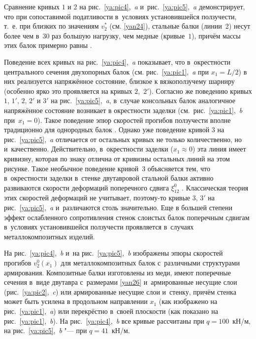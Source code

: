 Сравнение кривых $1$ и $2$ на рис.~\ref{ya:pic4},~{\sl a} и~рис.~\ref{ya:pic5},~{\sl a} демонстрирует, 
что при сопоставимой податливости в~условиях установившейся ползучести, т.~е. при близких по значениям $v_2^*$ (см. \eqref{yan24}), стальные балки (линии~2) несут более чем в~30 раз большую нагрузку, чем медные (кривые~$1$), причём массы этих балок примерно равны \cite{yan:bib15}.

Поведение всех кривых на рис.~\ref{ya:pic4},~{\sl a} показывает, что в~окрестности центрального сечения двухопорных балок (см. рис.~\ref{ya:pic1},~{\sl a} при $x_1=L/2$) в них реализуется напряжённое состояние, 
близкое к вязкоползучему шарниру (особенно ярко это проявляется на кривых $2$,~$2'$). 
Согласно же поведению кривых $1$, $1'$, $2$, $2'$ и $3'$ на рис.~\ref{ya:pic5},~{\sl a}, в~случае консольных балок аналогичное напряжённое состояние возникает в окрестности заделки (см.~рис.~\ref{ya:pic1},~{\sl b} при~$x_1=0$). 
Такое поведение эпюр скоростей прогибов ползучести вполне традиционно для однородных балок \cite{yan:bib4, yan:bib5}. 
Однако уже поведение кривой $3$ на рис.~\ref{ya:pic5},~{\sl a} отличается от остальных кривых не только количественно, но и~качественно. 
Действительно, в~окрестности заделки ($x_1\approx0$) эта линия имеет кривизну, которая по знаку отлична от кривизны остальных линий на этом рисунке. 
Такое необычное поведение кривой~$3$ объясняется тем, что в~окрестности заделки в~стенке двутавровой стальной балки активно развиваются скорости деформаций поперечного сдвига $\xi_{12}^0$ \cite{yan:bib9}. 
Классическая теория этих скоростей деформаций не учитывает, поэтому-то кривые $3$, $3'$ на рис.~\ref{ya:pic5},~{\sl a} и~различаются столь значительно. 
Еще в большей степени эффект ослабленного сопротивления стенок слоистых балок поперечным сдвигам в~условиях установившейся ползучести проявляется в~случаях металлокомпозитных изделий.

На рис.~\ref{ya:pic4},~{\sl b} и~на рис.~\ref{ya:pic5},~{\sl b} изображены эпюры скоростей прогибов $v_2^0(x_1)$ для металлокомпозитных балок с~различными структурами армирования. 
Композитные балки изготовлены из меди, имеют поперечные сечения в~виде двутавра с~размерами \eqref{yan26} и~армированные несущие слои (рис.~\ref{ya:pic2},~{\sl c}) или армированные несущие слои и~стенку, 
причём стенка может быть усилена в продольном направлении $x_1$ (как изображено на рис.~\ref{ya:pic1},~{\sl a}) 
или перекрёстно в~своей плоскости (как показано на рис.~\ref{ya:pic1},~{\sl b}). 
На рис.~\ref{ya:pic4},~{\sl b} все кривые рассчитаны при $q=100$~кН/м, 
на рис.~\ref{ya:pic5},~{\sl b} "--- при $q=41$~кН/м.

